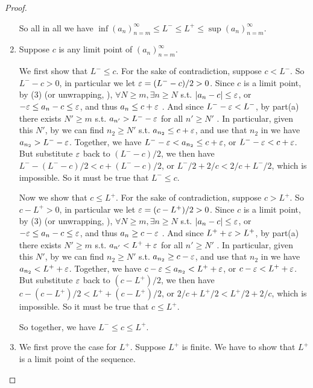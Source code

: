 \begin{proof}
\begin{enumerate}
      So all in all we have \(\inf(a_n)_{n = m}^{\infty} \le L^- \le L^+ \le \sup(a_n)_{n = m}^{\infty}\).
\item Suppose \(c\) is any limit point of \((a_n)_{n = m}^{\infty}\).

      We first show that \(L^- \le c\).
      For the sake of contradiction, suppose \(c < L^-\).
      So \(L^- - c > 0\), in particular we let \(\varepsilon = (L^- - c)/2 > 0\).
      Since \(c\) is a limit point, by (3) (or unwrapping, ), \(\forall N \ge m, \exists n \ge N\) s.t. \(\lvert a_n - c\rvert \le \varepsilon\),
      or \(-\varepsilon \le a_n - c \le \varepsilon\), and thus \(a_n \le c + \varepsilon\) .
      And since \(L^- - \varepsilon < L^-\), by part(a) there exists \(N' \ge m\) s.t. \(a_{n'} > L^- - \varepsilon\) for all \(n' \ge N'\) .
      In particular, given this \(N'\), by  we can find \(n_2 \ge N'\) s.t. \(a_{n_2} \le c + \varepsilon\), and use that \(n_2\) in  we have \(a_{n_2} > L^- - \varepsilon\).
      Together, we have \(L^- - \varepsilon < a_{n_2} \le c + \varepsilon\), or \(L^- - \varepsilon < c + \varepsilon\).
      But substitute \(\varepsilon\) back to \((L^- - c)/2\), we then have \(L^- - (L^- - c)/2 < c + (L^- - c)/2\),
      or \(L^-/2 + 2/c < 2/c + L^-/2\), which is impossible.
      So it must be true that \(L^- \le c\).
      
      Now we show that \(c \le L^+\).
      For the sake of contradiction, suppose \(c > L^+\).
      So \(c - L^+ > 0\), in particular we let \(\varepsilon = (c - L^+)/2 > 0\).
      Since \(c\) is a limit point, by (3) (or unwrapping, ), \(\forall N \ge m, \exists n \ge N\) s.t. \(\lvert a_n - c\rvert \le \varepsilon\),
      or \(-\varepsilon \le a_n - c \le \varepsilon\), and thus \(a_n \ge c - \varepsilon\) .
      And since \(L^+ + \varepsilon > L^+\), by part(a) there exists \(N' \ge m\) s.t. \(a_{n'} < L^+ + \varepsilon\) for all \(n' \ge N'\) .
      In particular, given this \(N'\), by  we can find \(n_2 \ge N'\) s.t. \(a_{n_2} \ge c - \varepsilon\), and use that \(n_2\) in  we have \(a_{n_2} < L^+ + \varepsilon\).
      Together, we have \(c - \varepsilon \le a_{n_2} < L^+ + \varepsilon\), or \(c - \varepsilon < L^+ + \varepsilon\).
      But substitute \(\varepsilon\) back to \((c - L^+)/2\), we then have \(c - (c - L^+)/2 < L^+ + (c - L^+)/2\),
      or \(2/c + L^+/2 < L^+/2 + 2/c\), which is impossible.
      So it must be true that \(c \le L^+\).

      So together, we have \(L^- \le c \le L^+\).
\item We first prove the case for \(L^+\).
      Suppose \(L^+\) is finite.
      We have to show that \(L^+\) is a limit point of the sequence.


\end{enumerate}
\end{proof}

